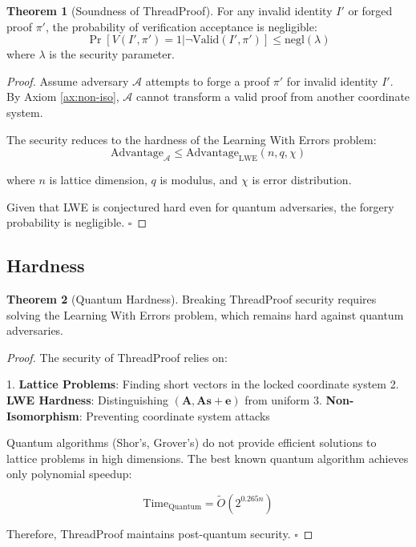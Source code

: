 \documentclass[11pt]{article}
\theoremstyle{definition}
\newtheorem{theorem}{Theorem}[section]
\begin{document}
\begin{theorem}[Soundness of ThreadProof]
For any invalid identity $I'$ or forged proof $\pi'$, the probability of verification acceptance is negligible:
$$\Pr[V(I', \pi') = 1 | \neg\text{Valid}(I', \pi')] \leq \text{negl}(\lambda)$$
where $\lambda$ is the security parameter.
\end{theorem}

\begin{proof}
Assume adversary $\mathcal{A}$ attempts to forge a proof $\pi'$ for invalid identity $I'$. By Axiom \ref{ax:non-iso}, $\mathcal{A}$ cannot transform a valid proof from another coordinate system. 

The security reduces to the hardness of the Learning With Errors problem:
$$\text{Advantage}_{\mathcal{A}} \leq \text{Advantage}_{\text{LWE}}(n, q, \chi)$$

where $n$ is lattice dimension, $q$ is modulus, and $\chi$ is error distribution.

Given that LWE is conjectured hard even for quantum adversaries, the forgery probability is negligible. $\square$
\end{proof}

\subsection{Hardness}

\begin{theorem}[Quantum Hardness]
Breaking ThreadProof security requires solving the Learning With Errors problem, which remains hard against quantum adversaries.
\end{theorem}

\begin{proof}
The security of ThreadProof relies on:

1. \textbf{Lattice Problems}: Finding short vectors in the locked coordinate system
2. \textbf{LWE Hardness}: Distinguishing $(\mathbf{A}, \mathbf{A}\mathbf{s} + \mathbf{e})$ from uniform
3. \textbf{Non-Isomorphism}: Preventing coordinate system attacks

Quantum algorithms (Shor's, Grover's) do not provide efficient solutions to lattice problems in high dimensions. The best known quantum algorithm achieves only polynomial speedup:

$$\text{Time}_{\text{Quantum}} = \tilde{O}(2^{0.265n})$$

Therefore, ThreadProof maintains post-quantum security. $\square$
\end{proof}
\end{document}
